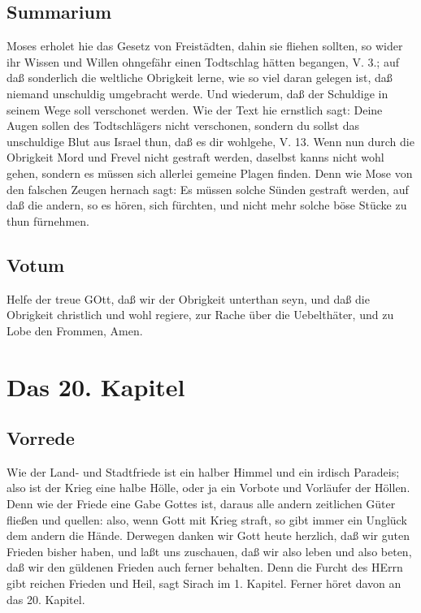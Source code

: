 \section{Summarium}

Moses erholet hie das Gesetz von Freistädten, dahin sie fliehen sollten, so wider ihr Wissen und Willen ohngefähr einen Todtschlag hätten begangen, V. 3.; auf daß sonderlich die weltliche Obrigkeit lerne, wie so viel daran gelegen ist, daß niemand unschuldig umgebracht werde. Und wiederum, daß der Schuldige in seinem Wege soll verschonet werden. Wie der Text hie ernstlich sagt: Deine Augen sollen des Todtschlägers nicht verschonen, sondern du sollst das unschuldige Blut aus Israel thun, daß es dir wohlgehe, V. 13. Wenn nun durch die Obrigkeit Mord und Frevel nicht gestraft werden, daselbst kanns nicht wohl gehen, sondern es müssen sich allerlei gemeine Plagen finden. Denn wie Mose von den falschen Zeugen hernach sagt: Es müssen solche Sünden gestraft werden, auf daß die andern, so es hören, sich fürchten, und nicht mehr solche böse Stücke zu thun fürnehmen.

\section{Votum}

Helfe der treue GOtt, daß wir der Obrigkeit unterthan seyn, und daß die Obrigkeit christlich und wohl regiere, zur Rache über die Uebelthäter, und zu Lobe den Frommen, Amen.

\chapter{Das 20. Kapitel}

\section{Vorrede}

Wie der Land- und Stadtfriede ist ein halber Himmel und ein irdisch Paradeis; also ist der Krieg eine halbe Hölle, oder ja ein Vorbote und Vorläufer der Höllen. Denn wie der Friede eine Gabe Gottes ist, daraus alle andern zeitlichen Güter fließen und quellen: also, wenn Gott mit Krieg straft, so gibt immer ein Unglück dem andern die Hände. Derwegen danken wir Gott heute herzlich, daß wir guten Frieden bisher haben, und laßt uns zuschauen, daß wir also leben und also beten, daß wir den güldenen Frieden auch ferner behalten. Denn die Furcht des HErrn gibt reichen Frieden und Heil, sagt Sirach im 1. Kapitel. Ferner höret davon an das 20. Kapitel.


